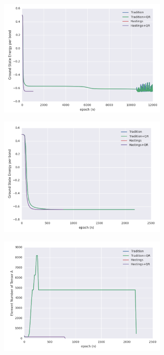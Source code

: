 \begin{figure}[ht]
	\centering
	\includegraphics[width=0.75\textwidth]{figures/fig325.png}
	\caption[tmp]{}
	\label{fig325}
\end{figure}

\begin{figure}[ht]
	\centering
	\includegraphics[width=0.75\textwidth]{figures/fig326.png}
	\caption[tmp]{}
	\label{fig326}
\end{figure}

\begin{figure}[ht]
	\centering
	\includegraphics[width=0.75\textwidth]{figures/fig327.png}
	\caption[tmp]{}
	\label{fig327}
\end{figure}
